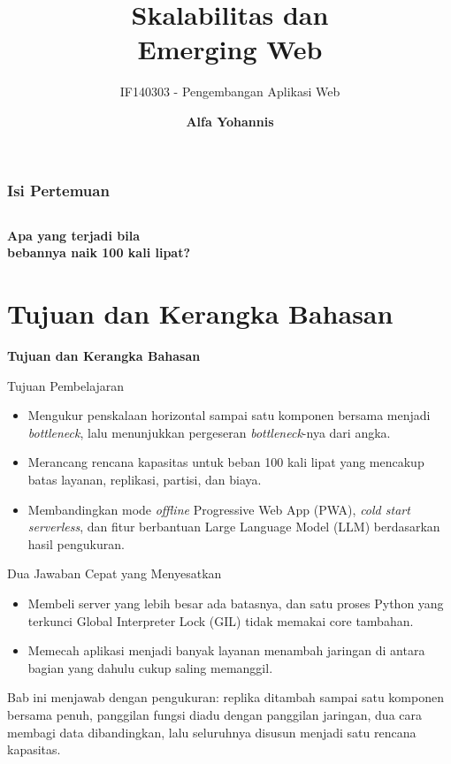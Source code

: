 \documentclass[aspectratio=169, table, 12pt]{beamer}
\title{\Huge Skalabilitas dan\\ \vspace{10pt} Emerging Web}
\subtitle{IF140303 - Pengembangan Aplikasi Web}
\author{\textbf{Alfa Yohannis}}
\begin{document}
\frame{\titlepage}

\begin{frame}[fragile]
  \frametitle{Isi Pertemuan}
  \vspace{14pt}
  \begin{columns}[t]
    {\small\tableofcontents[sections={1-7}]}

    {\small\tableofcontents[sections={8-13}]}
  \end{columns}
\end{frame}

\begin{frame}{\hfill}
  \centering
  \Huge{\textbf{Apa yang terjadi bila\\bebannya naik 100 kali lipat?}}
\end{frame}

\section{Tujuan dan Kerangka Bahasan}

\begin{frame}{\hfill}
  \centering
  \Huge{\textbf{Tujuan dan Kerangka Bahasan}}
\end{frame}

\begin{frame}{{\Large Tujuan Pembelajaran}}
  \vspace{10pt}
  \begin{itemize}
    \item Mengukur penskalaan horizontal sampai satu komponen bersama menjadi
          \textit{bottleneck}, lalu menunjukkan pergeseran
          \textit{bottleneck}-nya dari angka.
    \item Merancang rencana kapasitas untuk beban 100 kali lipat yang
          mencakup batas layanan, replikasi, partisi, dan biaya.
    \item Membandingkan mode \textit{offline} Progressive Web App (PWA),
          \textit{cold start} \textit{serverless}, dan fitur berbantuan Large
          Language Model (LLM) berdasarkan hasil pengukuran.
  \end{itemize}
\end{frame}

\begin{frame}{{\Large Dua Jawaban Cepat yang Menyesatkan}}
  \vspace{12pt}
  \begin{itemize}
    \item Membeli server yang lebih besar ada batasnya, dan satu proses
          Python yang terkunci Global Interpreter Lock (GIL) tidak memakai
          core tambahan.
    \item Memecah aplikasi menjadi banyak layanan menambah jaringan di antara
          bagian yang dahulu cukup saling memanggil.
  \end{itemize}
  \vspace{10pt}
  {\small Bab ini menjawab dengan pengukuran: replika ditambah sampai satu
  komponen bersama penuh, panggilan fungsi diadu dengan panggilan
  jaringan, dua cara membagi data dibandingkan, lalu seluruhnya disusun menjadi
  satu rencana kapasitas.}
\end{frame}
\end{document}
